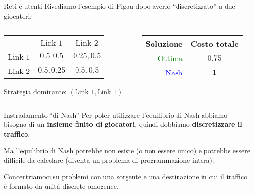 \documentclass{beamer}
\theoremstyle{plain}
\theoremstyle{definition}
\theoremstyle{remark}
\newcommand{\pa}[1]{\left(#1\right)}
\begin{document}
\begin{frame}{Reti e utenti}
  Rivediamo l'esempio di Pigou dopo averlo ``discretizzato'' a due giocatori:
  \begin{center}
  \end{center}
  
  \begin{columns}
    \begin{column}{0.56\textwidth}
      \begin{tabular}{rcc}
        & Link $1$ & Link $2$ \\
        \cline{2-3}
        Link $1$ & \multicolumn{1}{|c|}{$0.5,0.5$} & \multicolumn{1}{|c|}{$0.25,0.5$}  \\
        \cline{2-3}
        Link $2$ & \multicolumn{1}{|c|}{$0.5,0.25$} & \multicolumn{1}{|c|}{$0.5,0.5$}  \\
        \cline{2-3}
      \end{tabular}
      \vspace{3px}

      Strategia dominante: $\pa{\text{Link }1, \text{Link }1}$
    \end{column}
    \begin{column}{0.44\textwidth}
      \begin{tabular}{r|c}
        Soluzione & Costo totale \\
        \hline
        \textcolor{green}{Ottima} & $0.75$ \\
        \textcolor{blue}{Nash} & $1$
      \end{tabular}
    \end{column}
  \end{columns}
\end{frame}

\begin{frame}{Instradamento ``di Nash''}
  Per poter utilizzare l'equilibrio di Nash abbiamo bisogno di un
  \textbf{insieme finito di giocatori}, quindi dobbiamo
  \textbf{discretizzare il traffico}.

  Ma l'equilibrio di Nash potrebbe non esiste (o non essere unico) e
  potrebbe essere difficile da calcolare (diventa un problema di
  programmazione intera).
  \vfill

  Concentriamoci su problemi con una sorgente e una destinazione in
  cui il traffico è formato da unità discrete omogenee.
\end{frame}
\end{document}
